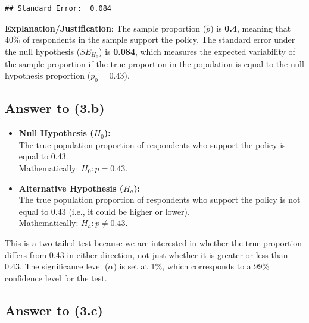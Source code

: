 \documentclass[
  11pt,
]{article}
\begin{document}
\begin{verbatim}
## Standard Error:  0.084
\end{verbatim}

\textbf{Explanation/Justification}: The sample proportion (\(\hat{p}\))
is \textbf{0.4}, meaning that 40\% of respondents in the sample support
the policy. The standard error under the null hypothesis (\(SE_{H_0}\))
is \textbf{0.084}, which measures the expected variability of the sample
proportion if the true proportion in the population is equal to the null
hypothesis proportion (\(p_0 = 0.43\)).

\subsection{Answer to (3.b)}\label{answer-to-3.b}

\begin{itemize}
\item
  \textbf{Null Hypothesis (\(H_0\)):}\\
  The true population proportion of respondents who support the policy
  is equal to 0.43.\\
  Mathematically: \(H_0: p = 0.43\).
\item
  \textbf{Alternative Hypothesis (\(H_a\)):}\\
  The true population proportion of respondents who support the policy
  is not equal to 0.43 (i.e., it could be higher or lower).\\
  Mathematically: \(H_a: p \neq 0.43\).
\end{itemize}

This is a two-tailed test because we are interested in whether the true
proportion differs from 0.43 in either direction, not just whether it is
greater or less than 0.43. The significance level (\(\alpha\)) is set at
1\%, which corresponds to a 99\% confidence level for the test.

\subsection{Answer to (3.c)}\label{answer-to-3.c}
\end{document}
